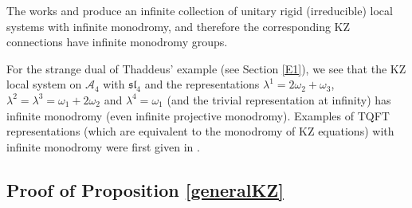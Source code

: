 The works \cite{BH} and \cite{Haraoka} produce an infinite collection of unitary rigid (irreducible) local systems with infinite monodromy, and therefore the corresponding KZ connections have infinite monodromy groups.
\begin{example}
\notready
For  the strange dual of Thaddeus' example (see Section \ref{E1}), we see that the KZ local system on $\mathcal{A}_4$ with  $\mathfrak{sl}_4$ and the representations $\lambda^1=2\omega_2+\omega_3$,
$\lambda^2=\lambda^3=\omega_1+2\omega_2$ and $\lambda^4=\omega_1$ (and the trivial representation at infinity) has infinite monodromy (even infinite projective monodromy). Examples of TQFT representations (which are equivalent to the monodromy of KZ equations) with infinite monodromy were first given in \cite{Masbaum}.
\end{example}
\subsection{Proof of  Proposition \ref{generalKZ}}
